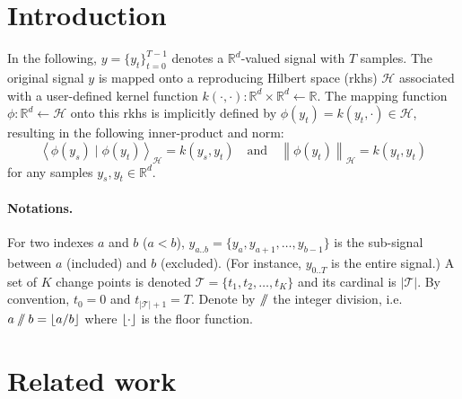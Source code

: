\documentclass[12pt]{article}
\newcommand\RR{\mathbb{R}}
\newcommand\HH{\mathcal{H}}
\newcommand{\norm}[1]{\left\lVert#1\right\rVert}
\newcommand{\sca}[2]{\left\langle#1\mid #2\right\rangle}
\newcommand{\TT}{\mathcal{T}}
\newcommand{\sslash}{\mathbin{/\mkern-6mu/}}
\DeclarePairedDelimiter\floor{\lfloor}{\rfloor}
\begin{document}
\maketitle

\section{Introduction}
In the following, $y=\{y_t\}_{t=0}^{T-1}$ denotes a $\RR^d$-valued signal with $T$ samples.
The original signal $y$ is mapped onto a reproducing Hilbert space (rkhs) $\HH$ associated with a user-defined kernel function $k(\cdot, \cdot):\RR^d\times\RR^d \leftarrow \RR$.
The mapping function $\phi:\RR^d \leftarrow\HH$ onto this rkhs is implicitly defined by $\phi(y_t)=k(y_t, \cdot)\in\HH$, resulting in the following inner-product and norm:
\begin{equation}
    \sca{\phi(y_s)}{\phi(y_t)}_\HH = k(y_s, y_t) \quad\text{and}\quad \norm{\phi(y_t)}_\HH = k(y_t, y_t)
\end{equation}
for any samples $y_s, y_t\in\RR^d$.

\paragraph{Notations.}
For two indexes $a$ and $b$ ($a<b$), $y_{a..b} = \{y_a,y_{a+1},\dots,y_{b-1}\}$ is the sub-signal between $a$ (included) and $b$ (excluded).
(For instance, $y_{0..T}$ is the entire signal.)
A set of $K$ change points is denoted $\TT=\{t_1,t_2,\dots,t_K\}$ and its cardinal is $|\TT|$.
By convention, $t_0=0$ and $t_{|\TT|+1}=T$.
Denote by $\sslash $ the integer division, i.e.\ $a\sslash b= \floor{a/b}$ where $\floor{\cdot}$ is the floor function.

\section{Related work}

\cite{Celisse2017}
\end{document}
